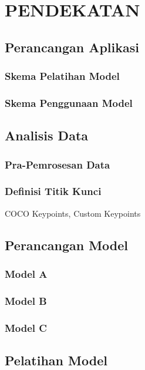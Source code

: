 
\chapter{PENDEKATAN}
\label{cha:3-Pendekatan}

\section{Perancangan Aplikasi} \label{sec:3-PerancanganAplikasi}
\subsection{Skema Pelatihan Model}
\subsection{Skema Penggunaan Model}

\section{Analisis Data} \label{sec:3-AnalisisData}

\subsection{Pra-Pemrosesan Data}

\subsection{Definisi Titik Kunci}
COCO Keypoints, Custom Keypoints

\section{Perancangan Model} \label{sec:3-PerancanganModel}
\subsection{Model A}
\subsection{Model B}
\subsection{Model C}

\section{Pelatihan Model} \label{sec:3-PelatihanModel}

